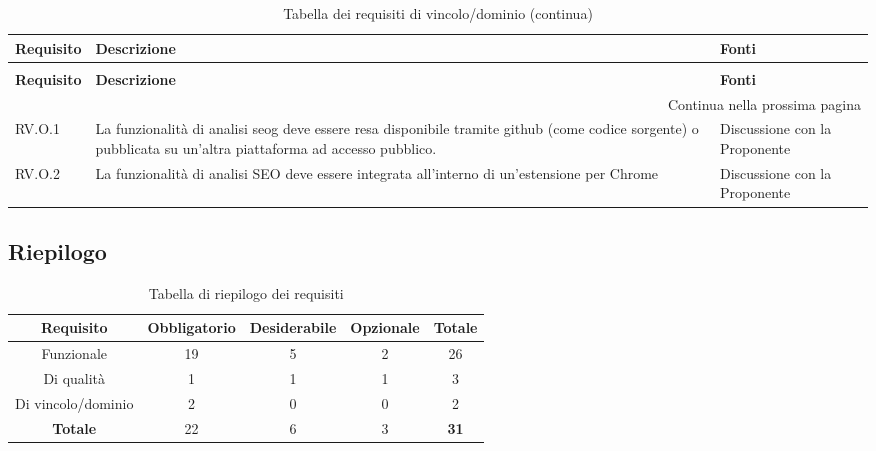 \renewcommand{\arraystretch}{1.5}
\begin{longtable}{p{}p{}p{}}
\caption{Tabella dei requisti di vincolo/dominio}
\label{tab:requisiti-vincolo} \\
\hline\hline
\textbf{Requisito} & \textbf{Descrizione} & \textbf{Fonti}\\
\endfirsthead
        
\caption[]{Tabella dei requisiti di vincolo/dominio (continua)} \\
\hline\hline
\textbf{Requisito} & \textbf{Descrizione} & \textbf{Fonti} \\ 
\endhead
        
\multicolumn{3}{r}{{Continua nella prossima pagina}} \\ 
\endfoot
        
\hline
\endlastfoot

\hline
RV.O.1 & La funzionalità di analisi \gls{seog} deve essere resa disponibile tramite \gls{github} (come codice sorgente) o pubblicata su un'altra piattaforma ad accesso pubblico. & Discussione con la Proponente \\
\hline
RV.O.2 & La funzionalità di analisi SEO deve essere integrata all'interno di un'estensione per Chrome & Discussione con la Proponente \\
\end{longtable}

\par\vspace{20pt}

\subsection{Riepilogo}

\begin{table}[H]
\centering
\caption{Tabella di riepilogo dei requisiti}
\label{tab:riepilogo-requisiti}
\begin{tabular}{ccccc}
\hline\hline
\textbf{Requisito} & \textbf{Obbligatorio} & \textbf{Desiderabile} & \textbf{Opzionale} & \textbf{Totale} \\ 
\hline
Funzionale & 19 & 5 & 2 & 26 \\
\hline
Di qualità & 1 & 1 & 1 & 3 \\
\hline 
Di vincolo/dominio & 2 & 0 & 0 & 2 \\
\hline
\textbf{Totale} & 22 & 6 & 3 & \textbf{31} \\ 
\hline
\end{tabular}
\end{table}
